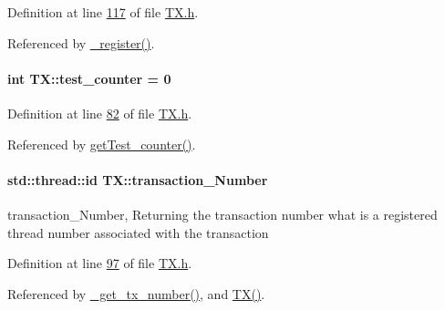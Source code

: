 Definition at line \hyperlink{_t_x_8h_source_l00117}{117} of file \hyperlink{_t_x_8h_source}{T\+X.\+h}.



Referenced by \hyperlink{_t_x_8cpp_source_l00096}{\+\_\+register()}.

\paragraph[{\texorpdfstring{test\+\_\+counter}{test_counter}}]{\setlength{\rightskip}{0pt plus 5cm}int T\+X\+::test\+\_\+counter = 0\hspace{0.3cm}{\ttfamily [static]}}\hypertarget{class_t_x_a25838234aab99ae891a90eb8623a8b3c_a25838234aab99ae891a90eb8623a8b3c}{}\label{class_t_x_a25838234aab99ae891a90eb8623a8b3c_a25838234aab99ae891a90eb8623a8b3c}


Definition at line \hyperlink{_t_x_8h_source_l00082}{82} of file \hyperlink{_t_x_8h_source}{T\+X.\+h}.



Referenced by \hyperlink{_t_x_8cpp_source_l00287}{get\+Test\+\_\+counter()}.

\paragraph[{\texorpdfstring{transaction\+\_\+\+Number}{transaction_Number}}]{\setlength{\rightskip}{0pt plus 5cm}std\+::thread\+::id T\+X\+::transaction\+\_\+\+Number\hspace{0.3cm}{\ttfamily [private]}}\hypertarget{class_t_x_a145a1c74b521f277fe481971a930b249_a145a1c74b521f277fe481971a930b249}{}\label{class_t_x_a145a1c74b521f277fe481971a930b249_a145a1c74b521f277fe481971a930b249}
transaction\+\_\+\+Number, Returning the transaction number what is a registered thread number associated with the transaction 

Definition at line \hyperlink{_t_x_8h_source_l00097}{97} of file \hyperlink{_t_x_8h_source}{T\+X.\+h}.



Referenced by \hyperlink{_t_x_8cpp_source_l00294}{\+\_\+get\+\_\+tx\+\_\+number()}, and \hyperlink{_t_x_8cpp_source_l00036}{T\+X()}.

